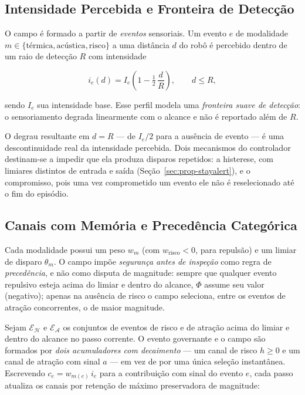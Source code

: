 \subsection{Intensidade Percebida e Fronteira de Detecção}

O campo é formado a partir de \emph{eventos} sensoriais. Um evento $e$ de modalidade
$m\in\{\text{térmica},\text{acústica},\text{risco}\}$ a uma distância $d$ do robô é
percebido dentro de um raio de detecção $R$ com intensidade

\begin{equation}
\label{eq:prop-intensidade}
i_e(d) = I_e\left(1 - \tfrac{1}{2}\,\frac{d}{R}\right), \qquad d \le R,
\end{equation}

sendo $I_e$ sua intensidade base. Esse perfil modela uma \emph{fronteira suave de
detecção}: o sensoriamento degrada linearmente com o alcance e não é reportado além
de $R$.

O degrau resultante em $d=R$ --- de $I_e/2$ para a ausência de evento --- é uma
descontinuidade real da intensidade percebida. Dois mecanismos do controlador
destinam-se a impedir que ela produza disparos repetidos: a histerese, com limiares
distintos de entrada e saída (Seção~\ref{sec:prop-stayalert}), e o compromisso, pois
uma vez comprometido um evento ele não é reselecionado até o fim do episódio.

\subsection{Canais com Memória e Precedência Categórica}

Cada modalidade possui um peso $w_m$ (com $w_{\text{risco}}<0$, para repulsão) e um
limiar de disparo $\theta_m$. O campo impõe \emph{segurança antes de inspeção} como
regra de \emph{precedência}, e não como disputa de magnitude: sempre que qualquer
evento repulsivo esteja acima do limiar e dentro do alcance, $\Phi$ assume seu valor
(negativo); apenas na ausência de risco o campo seleciona, entre os eventos de
atração concorrentes, o de maior magnitude.

Sejam $\mathcal{E}_{\mathcal{H}}$ e $\mathcal{E}_{\mathcal{A}}$ os conjuntos de
eventos de risco e de atração acima do limiar e dentro do alcance no passo corrente.
O evento governante e o campo são formados por \emph{dois acumuladores com
decaimento} --- um canal de risco $h\ge 0$ e um canal de atração com sinal $a$ ---
em vez de por uma única seleção instantânea. Escrevendo $c_e=w_{m(e)}\,i_e$ para a
contribuição com sinal do evento $e$, cada passo atualiza os canais por retenção de
máximo preservadora de magnitude:

